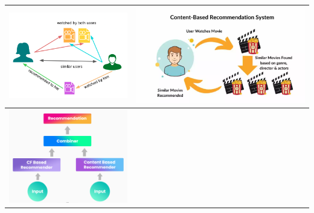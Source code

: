 \begin{table}[H]
    \centering
    \footnotesize
    \setlength\tabcolsep{0pt}
    \begin{tabularx}{\textwidth}{|X|X|}
        \hline
        \includegraphics[width=\linewidth, trim=0 0 0 0]{images/cfRecSys.png} &
        \includegraphics[width=\linewidth, trim=0 0 0 0]{images/contentbased.png} \\
        \hline
        \includegraphics[width=\linewidth, trim=0 0 0 0]{images/hybridRecSys.png} &

\end{tabularx}
\end{table}
